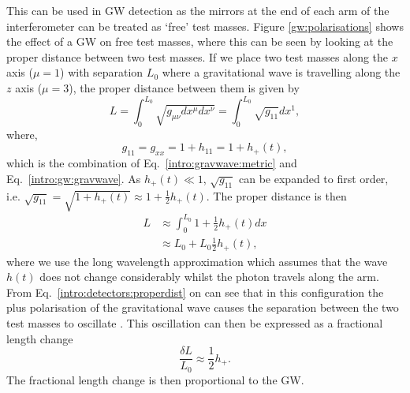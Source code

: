 This can be used in \gls{GW} detection
as the mirrors at the end of each arm of the interferometer can be treated as
`free' test masses.  Figure \ref{gw:polarisations} shows the effect of a
\gls{GW} on free test masses, where this can be seen by looking at the proper
distance between two test masses.  If we place two test masses along the $x$
axis ($\mu = 1$) with separation $L_0$ where a gravitational wave is travelling
along the $z$ axis ($\mu = 3$), the proper distance between them is given by
%
\begin{equation}
    L = \int_{0}^{L_0} \sqrt{g_{\mu \nu} dx^{\mu} dx^{\nu}}= \int_{0}^{L_0} \sqrt{g_{11}} dx^1,
\end{equation}
%
where,
\begin{equation}
    \label{intro:detectors:metricpertubation}
     g_{11} = g_{xx} = 1 + h_{11} = 1 + h_{+}(t),
\end{equation}
which is the combination of Eq.~\ref{intro:gravwave:metric} and Eq.~\ref{intro:gw:gravwave}.  As $h_{+}(t) \ll 1$, $\sqrt{g_{11}}$ can be expanded to first order, i.e.  $\sqrt{g_{11}} = \sqrt{1 +
h_{+}(t)} \approx 1 + \frac{1}{2}h_{+}(t)$.  The proper distance is then
%
\begin{equation}
    \label{intro:detectors:properdist}
    \begin{split}
     L &\approx \int_{0}^{L_0} 1 + \frac{1}{2}h_{+}(t) dx \\
      &\approx L_0 + L_0 \frac{1}{2}h_{+}(t),
    \end{split}
\end{equation}
%
where we use the long wavelength approximation which assumes that the wave
$h(t)$ does not change considerably whilst the photon travels along the arm.
From Eq.~\ref{intro:detectors:properdist} on can see that in this configuration the
plus polarisation of the gravitational wave causes the separation between the
two test masses to oscillate \citep{flanagan2005BasicsGravitational}.  This
oscillation can then be expressed as a fractional length change
%
\begin{equation}
    \label{intro:detectors:fraclength}
    \frac{\delta L}{L_0} \approx \frac{1}{2} h_{+}.
\end{equation}
%
The fractional length change is then proportional to the \gls{GW}.

